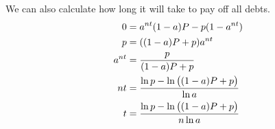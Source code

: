 \documentclass[12pt]{article}
\begin{document}
We can also calculate how long it will take to pay off all debts.
\begin{align*}
    0 &= a^{nt} (1 - a) P - p (1 - a^{nt})\\
    p &= ((1 - a) P + p) a^{nt}\\
    a^{nt} &= \frac{p}{(1 - a) P + p}\\
    nt &= \frac{\ln{p} - \ln\del{(1 - a) P + p}}{\ln{a}}\\
    t &= \frac{\ln{p} - \ln\del{(1 - a) P + p}}{n \ln{a}}\\
\end{align*}
\end{document}
